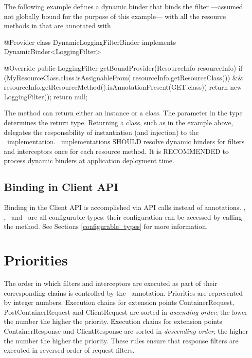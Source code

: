 The following example defines a dynamic binder that binds the filter  ---assumed not globally bound for the purpose of this example--- with all the resource methods in  that are annotated with .

\begin{listing}{1}
@Provider
class DynamicLoggingFilterBinder implements DynamicBinder<LoggingFilter> {

  @Override
  public LoggingFilter getBoundProvider(ResourceInfo resourceInfo) {
    if (MyResourceClass.class.isAssignableFrom(
    	      resourceInfo.getResourceClass()) &&
        resourceInfo.getResourceMethod().isAnnotationPresent(GET.class)) {
          return new LoggingFilter();
    }
    return null;
 }
}
\end{listing}

The method  can return either an instance or a class. The parameter  in the type  determines the return type. Returning a class, such as  in the example above, delegates the responsibility of instantiation (and injection) to the \jaxrs\ implementation.
\jaxrs\ implementations SHOULD resolve dynamic binders for filters and interceptors once for each resource method. It is RECOMMENDED to process dynamic binders at application deployment time.

\subsection{Binding in Client API}
\label{binding_in_client_api}

Binding in the Client API is accomplished via API calls instead of annotations. \Client, \Invocation, \InvocationBuilder\ and \WebTarget\ are all configurable types: their configuration can be accessed by calling the  method. See Sections \ref{configurable_types} for more information.

\section{Priorities}
\label{priorities}

The order in which filters and interceptors are executed as part of their corresponding chains is controlled by the \BindingPriority\ annotation.
Priorities are represented by integer numbers. Execution chains for extension points ContainerRequest, PostContainerRequest and ClientRequest are sorted in \emph{ascending order}; the lower the number the higher the priority. Execution chains for extension points ContainerResponse and ClientResponse are sorted in \emph{descending order}; the higher the number the higher the priority. These rules ensure that response filters are executed in reversed order of request filters.


